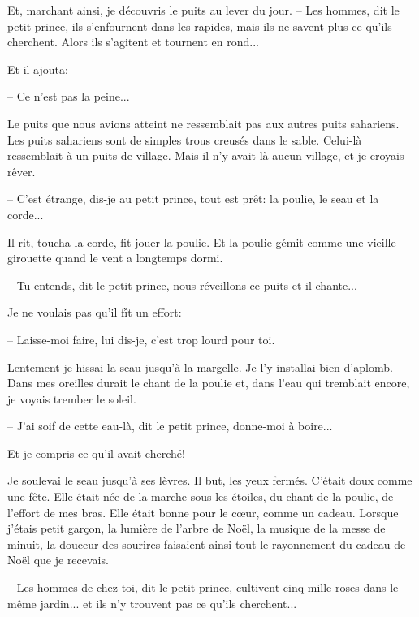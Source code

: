 \documentclass[a4paper]{report}
\begin{document}
Et, marchant ainsi, je découvris le puits au lever du jour.
\parachapter[XXV]{} %
-- Les hommes, dit le petit prince, ils s'enfournent dans les rapides, mais ils ne savent plus ce qu'ils cherchent. Alors ils s'agitent et tournent en rond...

Et il ajouta:

-- Ce n'est pas la peine...

Le puits que nous avions atteint ne ressemblait pas aux autres puits sahariens. Les puits sahariens sont de simples trous creusés dans le sable. Celui-là ressemblait à un puits de village. Mais il n'y avait là aucun village, et je croyais rêver.


-- C'est étrange, dis-je au petit prince, tout est prêt: la poulie, le seau et la corde...

Il rit, toucha la corde, fit jouer la poulie. Et la poulie gémit comme une vieille girouette quand le vent a longtemps dormi.

-- Tu entends, dit le petit prince, nous réveillons ce puits et il chante...

Je ne voulais pas qu'il fît un effort:

-- Laisse-moi faire, lui dis-je, c'est trop lourd pour toi.

Lentement je hissai la seau jusqu'à la margelle. Je l'y installai bien d'aplomb. Dans mes oreilles durait le chant de la poulie et, dans l'eau qui tremblait encore, je voyais trember le soleil.

-- J'ai soif de cette eau-là, dit le petit prince, donne-moi à boire...

Et je compris ce qu'il avait cherché!

Je soulevai le seau jusqu'à ses lèvres. Il but, les yeux fermés. C'était doux comme une fête. Elle était née de la marche sous les étoiles, du chant de la poulie, de l'effort de mes bras. Elle était bonne pour le cœur, comme un cadeau. Lorsque j'étais petit garçon, la lumière de l'arbre de Noël, la musique de la messe de minuit, la douceur des sourires faisaient ainsi tout le rayonnement du cadeau de Noël que je recevais.

-- Les hommes de chez toi, dit le petit prince, cultivent cinq mille roses dans le même jardin... et ils n'y trouvent pas ce qu'ils cherchent...
\end{document}
